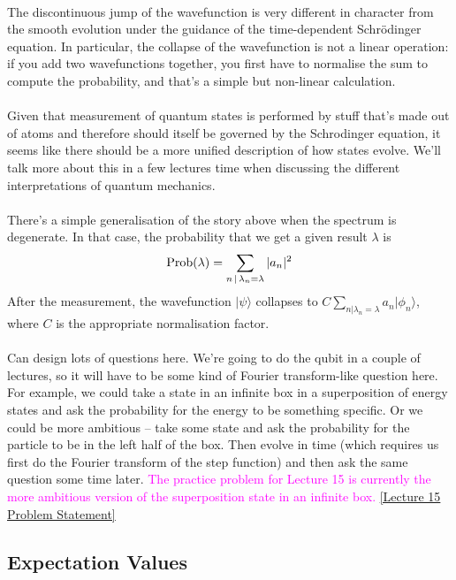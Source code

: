 \documentclass[12pt]{article}
\def\be{\begin{eqnarray}}
\def\ee{\end{eqnarray}}
\newcommand{\nn}{\nonumber}
\newcommand\para{\paragraph{}}
\newcommand{\ket}[1]{|#1\rangle}
\newcommand{\co}{\color{olive}}
\newcommand{\cblue}{\color{blue}}
\newcommand{\alyssa}{\textcolor{magenta}}
\begin{document}
{\para
The discontinuous jump of the wavefunction  is very different in character from the smooth evolution  under the guidance of the time-dependent Schr\"odinger equation. In particular, the collapse of the wavefunction is not a linear operation: if you add two wavefunctions together, you first have to normalise the sum to compute the probability, and that's a simple but non-linear calculation.

\para
Given that measurement of quantum states is performed by stuff that's made out of atoms and therefore should itself be governed by the Schrodinger equation, it seems like there should be a more unified description of how states evolve. We'll talk more about this in a few lectures time when discussing the different interpretations of quantum mechanics. 

\para
{\co There's a simple generalisation of the story above when the spectrum is degenerate. In that case, the probability that we get a given result $\lambda$ is
%
\be {\rm Prob}(\lambda) = \sum_{n\, |\, \lambda_n=\lambda} |a_n|^2\nn\ee
%
After the measurement, the wavefunction  $\ket{\psi}$ collapses to $C\sum_{n|\lambda_n=\lambda} a_n\ket{\phi_n}$, where $C$ is the appropriate normalisation factor. }


\para
{\cblue Can design lots of questions here. We're going to do the qubit in a couple of lectures, so it will have to be some kind of Fourier transform-like question here. For example, we could take a state in an infinite box in a superposition of energy states and ask the probability for the energy to be something specific. Or we could be more ambitious -- take some state and ask the probability for the particle to be in the left half of the box. Then evolve in time (which requires us first do the Fourier transform of the step function) and then ask the same question some time later.} \alyssa{The practice problem for Lecture 15 is currently the more ambitious version of the superposition state in an infinite box.} \href{https://drive.google.com/file/d/15Bvpf6_OoxxVA7U5_A12x5CQM7J7rL9H/view?usp=drive_link}{[Lecture 15 Problem Statement]}

\subsection{Expectation Values}

}
\end{document}
